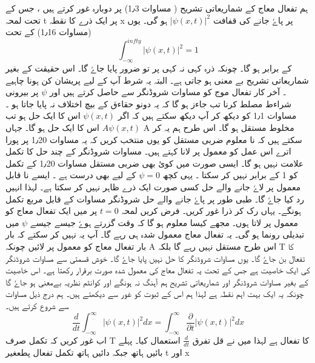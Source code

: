 \documentclass{book}
\begin{document}
ہم تفعال معاج کے شماریعاتی تشریح ( مساوات 1٫3) پر دوبارہ غور کرتے ہیں ، جس کے تحت لمحہ t پر ایک ذرے کا نقطہ x پر پاےٗ جانے کی قفافت 
$ | \psi (x , t) |^2 $
ہو گی۔  یوں (مساوات 1٫16) کے تحت 
\begin{equation}
\int_{-\infty}^{infty}|\psi(x,t)|^2 = 1
\end{equation}
کے برابر ہو گا۔  چونکہ ذرہ کہی نہ کہی پر تو ضرور پایا جاےٗ گا۔  اس حقیقت کے بغیر شماریعاتی تشریح بے معنی ہو جاتی ہے۔ البتہ یہ شرط آپ کے لیے  پریشان کن  ہونا چاہیے ۔ آخر کار  تفعال موج کو مساوات شروڈنگر سے حاصل کرتے ہیں اور 
$ \psi $
پر بیرونی شراءط مصلط کرنا تب جاءز ہو گا کہ یہ دونو حقاءق کے بیچ اختلاف نہ پایا جاتا ہو ۔
مساوات 1٫1 کو دیکھ کر  آپ دیکھ سکتے ہیں کہ اگر 
$ \psi (x , t) $
اس کا ایک حل ہو تب 
$ A \psi (x , t ) $
اس کا ایک حل ہو گا۔ جہاں A مخلوط مستقل ہو گا۔ اس طرح ہم یہ کر سکتے ہیں کہ نا معلوم  ضربی مستقل کو یوں منتخب کریں کہ یہ مساوات  1٫20 پر پورا اترے  اس عمل کو معمول پر لانا کہتے ہیں۔ مساوات شروڈنگر کے چند حل کا تکمل علامت نہیں ہو گا۔ ایسی صورت میں کوئ بھی ضربی مستقل مساوات 1٫20 کے تکمل کو 1 کے برابر نہیں کر سکتا ۔ یہی کچھ 
$ \psi = 0 $
کے لیے بھی درست ہے ۔ ایسے نا قابل معمول پر لاےٗ جانے والے حل کسی صورت ایک ذرے ظاہر نہیں کر سکتا ہے۔ لہذا انہیں رد کیا جاےٗ گا۔  طبی طور پر پاےٗ جانے والے حل شروڈنگر مساوات کے قابل مربع تکمل ہونگے۔ یہاں رک کر ذرا غور کریں۔ فرض کریں لمحہ
$ t = 0 $
پر میں ایک تفعال معاج کو معمول پر لاتا ہوں۔ مجھے کیسا معلوم ہو گا کہ وقت گزرتے ہوےٗ  جیسے جیسے 
$ \psi $
میں تبدیلی رونما ہو گی۔ یہ تفعال معاج معمول شدہ ہی رہے گا۔ آپ یہ نہیں کر سکتے کہ بار بار تفعال معاج کو معمول پر لائیں چونکہ A اس طرح مستقل نہیں رہے گا  بلکہ T کا تفعال بن جاےٗ گا۔ یوں مساوات شروڈنگر  کا حل نہیں پایا جاےٗ گا۔ خوش قسمتی سے مساوات شروڈنگر کی ایک خاصیت ہے  جس کے تحت یہ تفعال معاج  کی معمول شدہ صورت برقرار رکھتا ہے۔ اس خاصیت کے بغیر مساوات شروڈنگر  اور شماریعاتی تشریح ہم آہنگ نہ ہونگے اور  کوانٹم نظریہ بےمعنی ہو جاےٗ گا چونکہ یہ ایک بہت اہم نقطہ ہے لہذا ہم اس کے ثبوت کو غور سے دیکھتے ہیں۔ ہم درج ذیل مساوات سے شروع کرتے ہیں۔
\begin{equation}
\frac{d}{dt} \int_{-\infty}^{\infty} | \psi (x , t)|^2 dx = \int_{- \infty}^{\infty} \frac{ \partial}{\partial t} | \psi (x , t)|^2 dx 
\end{equation}
اب غور کریں کہ تکمل صرف T  کا تفعال ہے لہذا میں نے قل تفرق 
$ \frac{d}{dt} $
استعمال کیا۔  پہلے بائیں ہاتھ جبکہ دائیں ہاتھ تکمل  تفعال پطعغیر t اور x 
\end{document}
